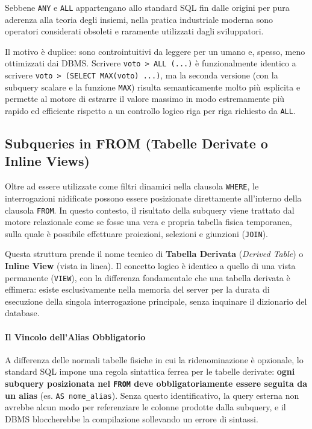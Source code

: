 \begin{bestpractice}
Sebbene \texttt{ANY} e \texttt{ALL} appartengano allo standard SQL fin dalle origini per pura aderenza alla teoria degli insiemi, nella pratica industriale moderna sono operatori considerati obsoleti e raramente utilizzati dagli sviluppatori. 

Il motivo è duplice: sono controintuitivi da leggere per un umano e, spesso, meno ottimizzati dai DBMS. Scrivere \texttt{voto > ALL (...)} è funzionalmente identico a scrivere \texttt{voto > (SELECT MAX(voto) ...)}, ma la seconda versione (con la subquery scalare e la funzione \texttt{MAX}) risulta semanticamente molto più esplicita e permette al motore di estrarre il valore massimo in modo estremamente più rapido ed efficiente rispetto a un controllo logico riga per riga richiesto da \texttt{ALL}.
\end{bestpractice}

\subsection{Subqueries in FROM (Tabelle Derivate o Inline Views)}

Oltre ad essere utilizzate come filtri dinamici nella clausola \texttt{WHERE}, le interrogazioni nidificate possono essere posizionate direttamente all'interno della clausola \texttt{FROM}. In questo contesto, il risultato della subquery viene trattato dal motore relazionale come se fosse una vera e propria tabella fisica temporanea, sulla quale è possibile effettuare proiezioni, selezioni e giunzioni (\texttt{JOIN}).

Questa struttura prende il nome tecnico di \textbf{Tabella Derivata} (\textit{Derived Table}) o \textbf{Inline View} (vista in linea). Il concetto logico è identico a quello di una vista permanente (\texttt{VIEW}), con la differenza fondamentale che una tabella derivata è effimera: esiste esclusivamente nella memoria del server per la durata di esecuzione della singola interrogazione principale, senza inquinare il dizionario del database.

\paragraph{Il Vincolo dell'Alias Obbligatorio}
A differenza delle normali tabelle fisiche in cui la ridenominazione è opzionale, lo standard SQL impone una regola sintattica ferrea per le tabelle derivate: \textbf{ogni subquery posizionata nel \texttt{FROM} deve obbligatoriamente essere seguita da un alias} (es. \texttt{AS nome\_alias}). Senza questo identificativo, la query esterna non avrebbe alcun modo per referenziare le colonne prodotte dalla subquery, e il DBMS bloccherebbe la compilazione sollevando un errore di sintassi.

